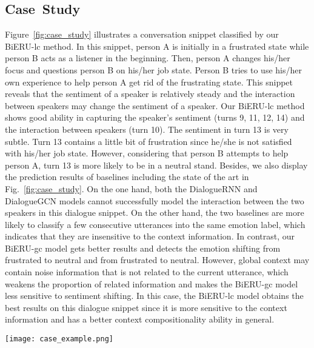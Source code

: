 \documentclass[journal]{IEEEtran}
\begin{document}
\subsection{Case~Study}
Figure~\ref{fig:case_study} illustrates a conversation snippet classified by our BiERU-lc method. In this snippet, person A is initially in a frustrated state while person B acts as a listener in the beginning. Then, person A changes his/her focus and questions person B on his/her job state. Person B tries to use his/her own experience to help person A get rid of the frustrating state. This snippet reveals that the sentiment of a speaker is relatively steady and the interaction between speakers may change the sentiment of a speaker. Our BiERU-lc method shows good ability in capturing the speaker's sentiment (turns 9, 11, 12, 14) and the interaction between speakers (turn 10). The sentiment in turn 13 is very subtle. Turn 13 contains a little bit of frustration since he/she is not satisfied with his/her job state. However, considering that person B attempts to help person A, turn 13 is more likely to be in a neutral stand. Besides, we also display the prediction results of baselines including the state of the art in Fig.~\ref{fig:case_study}. On the one hand, both the DialogueRNN and DialogueGCN models cannot successfully model the interaction between the two speakers in this dialogue snippet. On the other hand, the two baselines are more likely to classify a few consecutive utterances into the same emotion label, which indicates that they are insensitive to the context information. In contrast, our BiERU-gc model gets better results and detects the emotion shifting from frustrated to neutral and from frustrated to neutral. However, global context may contain noise information that is not related to the current utterance, which weakens the proportion of related information and makes the BiERU-gc model less sensitive to sentiment shifting. In this case, the BiERU-lc model obtains the best results on this dialogue snippet since it is more sensitive to the context information and has a better context compositionality ability in general.

\begin{figure*}[!ht]
    \centering
	\texttt{[image: case\_example.png]}
	\linespread{1}
\caption{Illustration of a conversation snippet from IEMOCAP dataset.}
\label{fig:case_study}
\end{figure*}{}
\end{document}
